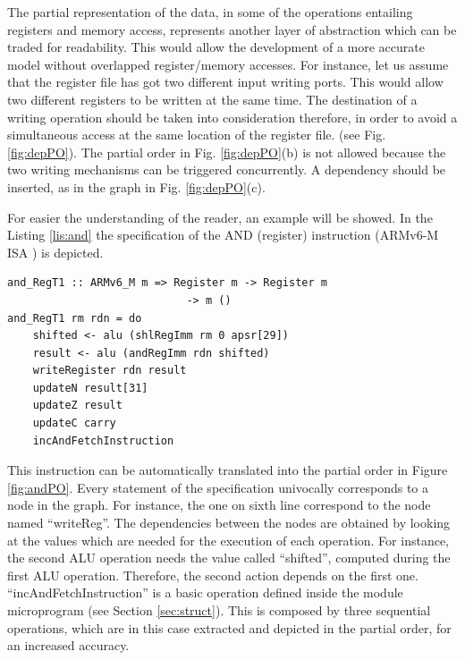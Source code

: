 \documentclass[conference]{IEEEtran}
\begin{document}
The partial representation of the data, in some of the operations entailing registers and
memory access, represents another layer of abstraction which can be traded for readability.
This would allow the development of a more accurate model without overlapped register/memory
accesses. For instance, let us assume that the register file has got two different input
writing ports. This would allow two different registers to be written at the same time.
The destination of a writing operation should be taken into consideration therefore,
in order to avoid a simultaneous access at the same location of the register file.
(see Fig. \ref{fig:depPO}). The partial order in Fig. \ref{fig:depPO}(b) is not allowed
because the two writing mechanisms can be triggered concurrently.
A dependency should be inserted, as in the graph in Fig. \ref{fig:depPO}(c).

For easier the understanding of the reader, an example will be showed. In the Listing
\ref{lis:and} the specification of the AND (register) instruction (ARMv6-M ISA
\cite{armManual}) is depicted.\\

\begin{lstlisting}[caption=AND (register) instruction - Haskell-based specification,
frame=single, label=lis:and]
and_RegT1 :: ARMv6_M m => Register m -> Register m 
			 				-> m ()
and_RegT1 rm rdn = do
    shifted <- alu (shlRegImm rm 0 apsr[29])
    result <- alu (andRegImm rdn shifted)
    writeRegister rdn result
    updateN result[31]
    updateZ result
    updateC carry
    incAndFetchInstruction
\end{lstlisting}

\noindent
This instruction can be automatically translated into the partial order in Figure
\ref{fig:andPO}. Every statement of the specification univocally corresponds to a node in the
graph. For instance, the one on sixth line correspond to the node named ``writeReg''.
The dependencies between the nodes are obtained by looking at the values which are needed for
the execution of each operation. For instance, the second ALU operation needs the value
called ``shifted'', computed during the first ALU operation. Therefore, the second action
depends on the first one.
``incAndFetchInstruction'' is a basic operation defined inside the module microprogram (see
Section \ref{sec:struct}). This is composed by three sequential operations, which are in this
case extracted and depicted in the partial order, for an increased accuracy.
\end{document}
